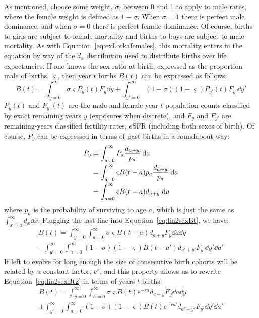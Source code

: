  \FloatBarrier
\label{sec:2sexlinearmain}
As mentioned, choose some weight, $\sigma$, between 0 and 1 to apply to male
rates, where the female weight is defined as $1 - \sigma$. When $\sigma = 1$
there is perfect male dominance, and when $\sigma = 0$ there is perfect female
dominance. Of course, births to girls are subject to female mortality and births
to boys are subject to male mortality. As with
Equation~\eqref{eq:exLotkafemales}, this mortality enters in the equation by way
of the $d_x$ distribution used to distribute births over life expectancies. If
one knows the sex ratio at birth, expressed as the proportion male of births,
$\varsigma$, then year $t$ births $B(t)$ can be expressed as follows:
\begin{equation}
\label{eq:lin2sexBt}
B(t) = \int_{y=0}^\infty \sigma \varsigma P_y(t) F_y \dd y + \int_{y'=0}^\infty
(1-\sigma) (1-\varsigma) P_{y'}(t) F_{y'} \dd y'
\end{equation}
$P_y(t)$ and $P_{y'}(t)$ are the male and female year $t$ population
counts classified by exact remaining years $y$ (exposures when discrete), and
$F_y$ and $F_{y'}$ are remaining-years classified fertility rates, $e$SFR
(including both sexes of birth). Of course, $P_y$ can be expressed in terms
of past births in a roundabout way:
\begin{align}
\label{eq:rexpressPy}
P_y &= \int_{a=0}^\infty P_a \frac{d_{a+y}}{p_a} \; \mathrm{d} a \notag \\
    &= \int_{a=0}^\infty \varsigma B(t-a)p_a \frac{d_{a+y}}{p_a} \; \mathrm{d} a \notag \\
    &= \int_{a=0}^\infty \varsigma B(t-a)d_{a+y} \; \mathrm{d} a
\end{align}
where $p_a$ is the probability of surviving to age $a$, which is just the same
as $\int_{x=a}^\infty d_x \dd x$. Plugging the last line into
Equation~\eqref{eq:lin2sexBt}, we have:
\begin{equation}
\begin{split}
\label{eq:lin2sexBt2}
B(t) = \int_{y=0}^\infty \int_{a=0}^\infty \sigma \varsigma B(t-a)d_{a+y} 
F_y \dd a \dd y \\+ \int_{y'=0}^\infty \int_{a=0}^\infty (1-\sigma)
(1-\varsigma) B(t-a')d_{a'+y'} F_{y'} \dd y' \dd a'
\end{split}
\end{equation}
If left to evolve for long enough the size of consecutive birth cohorts will be
related by a constant factor, $e^r$, and this property allows us to rewrite
Equation~\eqref{eq:lin2sexBt2} in terms of years $t$ births:
\begin{equation}
\begin{split}
\label{eq:lin2sexBt3}
B(t) = \int_{y=0}^\infty \int_{a=0}^\infty \sigma \varsigma B(t)e^{-ra}d_{a+y} 
F_y \dd a \dd y \\+ \int_{y'=0}^\infty \int_{a=0}^\infty (1-\sigma)
(1-\varsigma) B(t)e^{-ra'}d_{a'+y'} F_{y'} \dd y' \dd a'
\end{split}
\end{equation} 
